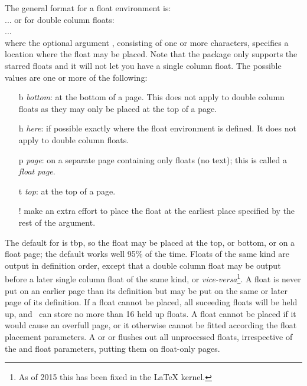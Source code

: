  The general format for a float environment is: \\
  ...  
or for double column floats: \\
  ...  \\
where the optional argument , consisting of one or more characters,
specifies a location where the float may be placed. Note that the 
 package only supports the 
starred floats and it will not let you have a single 
column float. The possible  values 
are one or more of the following:
\begin{itemize}
\item[\textsf{b}\ixposarg{b}] \emph{bottom}: at the bottom
    of a page. 
    This does not apply to double column floats 
    as they may only be placed at the top of a page.
\item[\textsf{h}\ixposarg{h}] \emph{here}: if possible exactly where 
  the float environment is defined. 
  It does not apply to double 
  column floats.
\item[\textsf{p}\ixposarg{p}] \emph{page}: on a separate page
  containing only floats (no text); this is called
  a \emph{float page}.
\item[\textsf{t}\ixposarg{t}] \emph{top}: at the top 
    of a page. 
\item[\textsf{!}] make an extra effort to place the float at the 
  earliest place specified by the rest of the argument.
\end{itemize}
The default for  is \textsf{t}\textsf{b}\textsf{p}, 
so the float may be placed at the top, or bottom, or on a 
float page; the default works well 95\% of the time.
Floats of the same kind are output in
definition order, except that a double column float 
may be output before
a later single column float of the same kind, or 
\textit{vice-versa}\footnote{As of 2015 this has been fixed in the
  \LaTeX{} kernel.}. 
A float is never put on an earlier page than its definition but may be 
put on the same or later page of its definition. If a float cannot be 
placed, all suceeding floats will be held up, and \ltx\ can store no 
more than 16 held up floats. A float cannot be placed if it would cause 
an overfull page, or it otherwise cannot be fitted according the  
float placement parameters.
A \cmd{\clearpage} or \cmd{\cleardoublepage} or  
flushes
out all unprocessed floats, irrespective of the  and float
parameters, putting them on float-only pages. 

